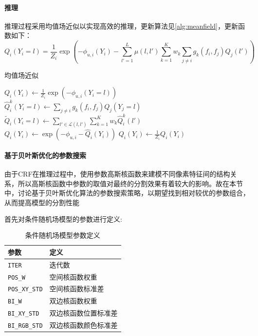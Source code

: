 \documentclass[a4paper,12pt]{ctexart}
\begin{document}
\paragraph{推理}
推理过程采用均值场近似以实现高效的推理，更新算法见\ref{alg:meanfield}，更新函数如下：
$$
Q_i(Y_i = l) = \frac{1}{Z_i} \exp \left( -\phi_{u,i}(Y_i) - \sum_{l' = 1}^{L} \mu(l, l') \sum_{k=1}^{K} w_k \sum_{j \neq i} g_k(f_i, f_j) Q_j(l') \right)
$$
\begin{algorithm}
    \caption{均值场近似}
    \label{alg:meanfield}
    \begin{algorithmic}[1]
    \STATE $Q_i(Y_i) \leftarrow \frac{1}{Z_i} \exp\left(-\phi_{u,i}(Y_i = l)\right)$ 
        \STATE $\hat{Q}_i^k(Y_i = l) \leftarrow \sum_{j \neq i} g_k(f_i, f_j) Q_j(Y_j = l)$ 
        \STATE $\tilde{Q}_i(Y_i = l) \leftarrow \sum_{l' \in \mathcal{L}(l, l')} \sum_{k=1}^{K} w_k \hat{Q}_i^k(l')$ 
        \STATE $Q_i(Y_i) \leftarrow \exp\left(-\phi_{u,i} - \hat{Q}_i(Y_i)\right)$ 
        \STATE $Q_i(Y_i) \leftarrow \frac{1}{Z_i} Q_i(Y_i)$ 
    \ENDWHILE
    \end{algorithmic}
\end{algorithm}

\paragraph{基于贝叶斯优化的参数搜索}
由于CRF在推理过程中，使用参数高斯核函数来建模不同像素特征间的结构关系，所以高斯核函数中参数的取值对最终的分割效果有着较大的影响。故在本节中，讨论基于贝叶斯优化算法的参数搜索策略，以期望找到相对较优的参数组合，从而提高模型的分割性能

首先对条件随机场模型的参数进行定义:
\begin{table}[H]
    \centering
    \begin{tabular}{@{}ll@{}}
    \toprule
    \textbf{参数}       & \textbf{定义}            \\ \midrule
    \texttt{ITER}        & 迭代数                  \\
    \texttt{POS\_W}      & 空间核函数权重          \\
    \texttt{POS\_XY\_STD} & 空间核函数标准差        \\
    \texttt{BI\_W}       & 双边核函数权重          \\
    \texttt{BI\_XY\_STD}  & 双边核函数位置标准差    \\
    \texttt{BI\_RGB\_STD} & 双边核函数颜色标准差    \\ \bottomrule
    \end{tabular}
    \caption{条件随机场模型参数定义}
\end{table}
\end{document}

